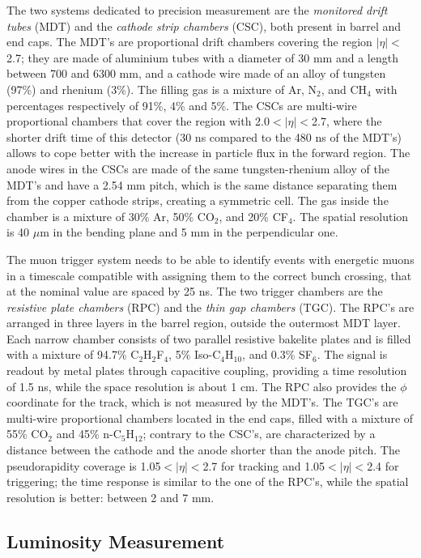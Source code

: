 The two systems dedicated to precision measurement are the \textit{monitored drift tubes} (MDT)  and the \textit{cathode strip chambers} (CSC), both present in barrel and end caps. The MDT's are proportional drift chambers covering the region $|\eta|<$2.7; they are made of aluminium tubes with a diameter of 30 mm and a length between 700 and 6300 mm, and a cathode wire made of an alloy of tungsten (97\%) and rhenium (3\%). The filling gas is a mixture of Ar, N$_2$, and CH$_4$ with percentages respectively of 91\%, 4\% and 5\%. The CSCs are multi-wire proportional chambers that cover the region with 2.0$<|\eta|<$2.7, where the shorter drift time of this detector (30 ns compared to the 480 ns of the MDT's) allows to cope better with the increase in particle flux in the forward region. The anode wires in the CSCs are made of the same tungsten-rhenium alloy of the MDT's and have a 2.54 mm pitch, which is the same distance separating them from the copper cathode strips, creating a symmetric cell. The gas inside the chamber is a mixture of 30\% Ar, 50\% CO$_2$, and 20\% CF$_4$. The spatial resolution is 40 $\mu$m in the bending plane and 5 mm in the perpendicular one.

The muon trigger system needs to be able to identify events with energetic muons in a timescale compatible with assigning them to the correct bunch crossing, that at the nominal value are spaced by 25 ns. The two trigger chambers are the \textit{resistive plate chambers} (RPC) and the \textit{thin gap chambers} (TGC). The RPC's are arranged in three layers in the barrel region, outside the outermost MDT layer. Each narrow chamber consists of two parallel resistive bakelite plates and is filled with a mixture of 94.7\% C$_2$H$_2$F$_4$, 5\% Iso-C$_4$H$_{10}$, and 0.3\% SF$_6$. The signal is readout by metal plates through capacitive coupling, providing a time resolution of 1.5 ns, while the space resolution is about 1 cm. The RPC also provides the $\phi$ coordinate for the track, which is not measured by the MDT's. The TGC's are multi-wire proportional chambers located in the end caps, filled with a mixture of 55\% CO$_2$ and 45\% n-C$_5$H$_{12}$; contrary to the CSC's, are characterized by a distance between the cathode and the anode shorter than the anode pitch. The pseudorapidity coverage is 1.05$<|\eta|<$2.7 for tracking and 1.05$<|\eta|<$2.4 for triggering; the time response is similar to the one of the RPC's, while the spatial resolution is better: between 2 and 7 mm. 

\subsection{Luminosity Measurement}

